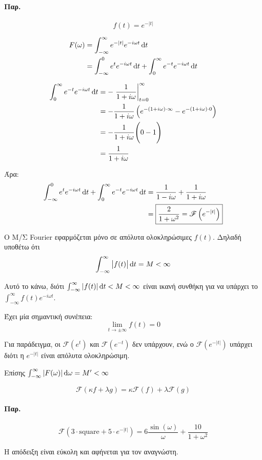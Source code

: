 \documentclass[11pt,a4paper,titlepage,final]{article}
\begin{document}
\paragraph{Παρ.}
\[
f(t)=e^{-|t|}
\]

\begin{align*}
F( \omega )&=\int_{- \infty }^ \infty e^{-|t|} e^{-i \omega t} \dif t
\\ &=
\int_{- \infty }^0 e^t e^{-i \omega t} \dif t
+ \int_0^ \infty e^{-t}e^{-i \omega t} \dif t
\end{align*}

\begin{align*}
\int_0^ \infty e^{-t}e^{-i \omega t} \dif t &=
-\left. \frac{1}{1+i\omega} \right|_{t=0}^\infty
\\
&= -\frac{1}{1+i\omega} \left(
e^{-(1+i \omega )\cdot\infty}-e^{-(1+i \omega )\cdot0}
\right)
\\ &=
-\frac{1}{1+i\omega}
\Bigg(
0-1
\Bigg)
\\ &= \frac{1}{1+i\omega}
\end{align*}


Άρα:
\begin{align*}
\int_{- \infty }^0 e^t e^{-i \omega t} \dif t
+ \int_0^ \infty e^{-t}e^{-i \omega t} \dif t
&= \frac{1}{1-i \omega }+\frac{1}{1+i \omega }\\
&=
\boxed{
\frac{2}{1+\omega^2} = \mathscr{F} \left(
e^{-|t|}
\right)
}
\end{align*}

\begin{tcolorbox}
Ο Μ/Σ \textlatin{Fourier} εφαρμόζεται μόνο σε απόλυτα ολοκληρώσιμες \(f(t)\). Δηλαδή υποθέτω ότι \[
\int_{- \infty }^ \infty
\left|
f(t)
\right|
\dif t = M <  \infty
\]

Αυτό το κάνω, διότι \(\int_{- \infty }^ \infty |f(t)| \dif t < M < \infty\) είναι ικανή συνθήκη για να υπάρχει το \(\int_{- \infty }^ \infty f(t)e^{-i\omega t}\).

Έχει μία σημαντική συνέπεια:
\[
\lim_{t\to\pm\infty} f(t) = 0
\]

Για παράδειγμα, οι \(\mathscr{F}(e^t)\) και \(\mathscr{F}(e^{-t})\) δεν υπάρχουν, ενώ ο \(\mathscr{F}(e^{-|t|})\) υπάρχει διότι η \(e^{-|t|}\) είναι απόλυτα ολοκληρώσιμη.

Επίσης \( \int_{-\infty}^ \infty |F(\omega)| \dif \omega = M' < \infty \)
\end{tcolorbox}

\begin{theorem}{}{}
\[
\mathscr{F}(\kappa f + \lambda g) = \kappa \mathscr{F}(f)+\lambda \mathscr{F}(g)
\]
\tcblower
\paragraph{Παρ.}
\[
 \mathscr{F} (3\cdot \mathrm{square} + 5\cdot e^{-|t|}) = 6 \frac{\sin(\omega)}{\omega}+\frac{10}{1+\omega^2}
\]
\end{theorem}
Η απόδειξη είναι εύκολη και αφήνεται για τον αναγνώστη.
\end{document}
